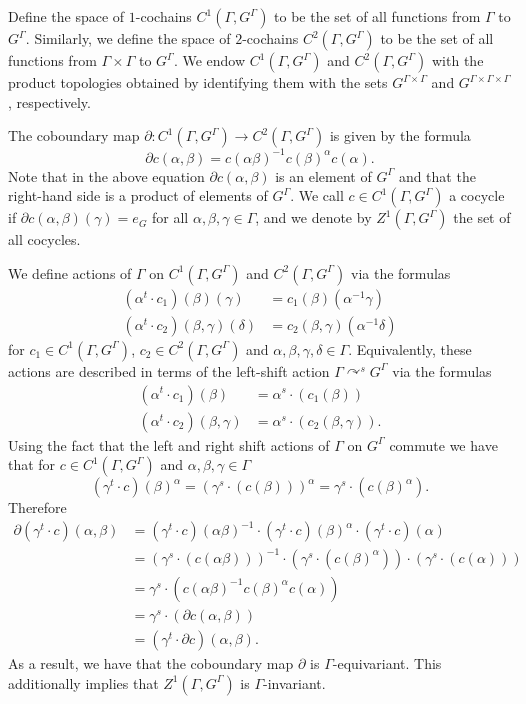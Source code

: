 \documentclass[12pt]{amsart}
\theoremstyle{definition}
\newcommand{\acts}{\curvearrowright}
\begin{document}
Define the space of $1$-cochains $C^1(\Gamma, G^\Gamma)$ to be the set of all functions from $\Gamma$ to $G^\Gamma$. Similarly, we define the space of $2$-cochains $C^2(\Gamma, G^\Gamma)$ to be the set of all functions from $\Gamma \times \Gamma$ to $G^\Gamma$. We endow $C^1(\Gamma, G^\Gamma)$ and $C^2(\Gamma, G^\Gamma)$ with the product topologies obtained by identifying them with the sets $G^{\Gamma \times \Gamma}$ and $G^{\Gamma \times \Gamma \times \Gamma}$, respectively.

The coboundary map $\partial : C^1(\Gamma, G^\Gamma) \rightarrow C^2(\Gamma, G^\Gamma)$ is given by the formula
\[\partial c(\alpha, \beta) = c(\alpha \beta)^{-1} c(\beta)^\alpha c(\alpha) .\]
Note that in the above equation $\partial c(\alpha, \beta)$ is an element of $G^\Gamma$ and that the right-hand side is a product of elements of $G^\Gamma$. We call $c \in C^1(\Gamma, G^\Gamma)$ a cocycle if $\partial c(\alpha, \beta)(\gamma) = e_G$ for all $\alpha, \beta, \gamma \in \Gamma$, and we denote by $Z^1(\Gamma, G^\Gamma)$ the set of all cocycles.

We define actions of $\Gamma$ on $C^1(\Gamma, G^\Gamma)$ and $C^2(\Gamma, G^\Gamma)$ via the formulas
\begin{align*}
	(\alpha^t \cdot c_1)(\beta)(\gamma) & = c_1(\beta)(\alpha^{-1} \gamma)\\
	(\alpha^t \cdot c_2)(\beta, \gamma)(\delta) & = c_2(\beta, \gamma)(\alpha^{-1} \delta)
\end{align*}
for $c_1 \in C^1(\Gamma, G^\Gamma)$, $c_2 \in C^2(\Gamma, G^\Gamma)$ and $\alpha, \beta, \gamma, \delta \in \Gamma$. Equivalently, these actions are described in terms of the left-shift action $\Gamma \acts^s G^\Gamma$ via the formulas
\begin{align*}
	(\alpha^t \cdot c_1)(\beta) & = \alpha^s \cdot (c_1(\beta))\\
	(\alpha^t \cdot c_2)(\beta, \gamma) & = \alpha^s \cdot (c_2(\beta, \gamma)).
\end{align*}
Using the fact that the left and right shift actions of $\Gamma$ on $G^\Gamma$ commute we have that for $c \in C^1(\Gamma, G^\Gamma)$ and $\alpha, \beta, \gamma \in \Gamma$
\[(\gamma^t \cdot c)(\beta)^\alpha = (\gamma^s \cdot (c(\beta)))^\alpha = \gamma^s \cdot (c(\beta)^\alpha).\]
Therefore
\begin{align*}
	\partial(\gamma^t \cdot c)(\alpha, \beta) & = (\gamma^t \cdot c)(\alpha \beta)^{-1} \cdot (\gamma^t \cdot c)(\beta)^\alpha \cdot (\gamma^t \cdot c)(\alpha)\\
	& = (\gamma^s \cdot (c(\alpha \beta)))^{-1} \cdot (\gamma^s \cdot (c(\beta)^\alpha)) \cdot (\gamma^s \cdot (c(\alpha)))\\
	& = \gamma^s \cdot (c(\alpha \beta)^{-1} c(\beta)^\alpha c(\alpha))\\
	& = \gamma^s \cdot (\partial c(\alpha, \beta))\\
	& = (\gamma^t \cdot \partial c)(\alpha, \beta).
\end{align*}
As a result, we have that the coboundary map $\partial$ is $\Gamma$-equivariant. This additionally implies that $Z^1(\Gamma, G^\Gamma)$ is $\Gamma$-invariant.
\end{document}
